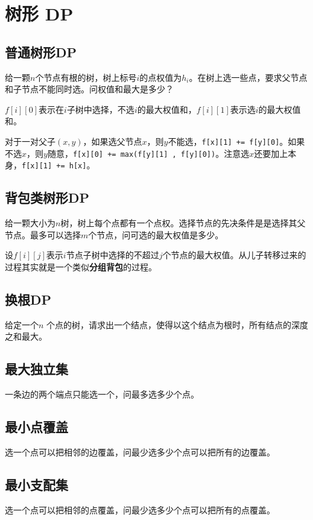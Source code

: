 \section{树形 DP}

\subsection{普通树形DP}

\begin{framed}
    给一颗$n$个节点有根的树，树上标号$i$的点权值为$h_i$。在树上选一些点，要求父节点和子节点不能同时选。问权值和最大是多少？
\end{framed}

$f[i][0]$表示在$i$子树中选择，不选$i$的最大权值和，$f[i][1]$表示选$i$的最大权值和。

对于一对父子$(x,y)$，如果选父节点$x$，则$y$不能选，\verb|f[x][1] += f[y][0]|。如果不选$x$，则$y$随意，\verb|f[x][0] += max(f[y][1] , f[y][0])|。注意选$x$还要加上本身，\verb|f[x][1] += h[x]|。



\subsection{背包类树形DP}

\begin{framed}
    给一颗大小为$n$树，树上每个点都有一个点权。选择节点的先决条件是是选择其父节点。最多可以选择$m$个节点，问可选的最大权值是多少。
\end{framed}

设$f[i][j]$表示$i$节点子树中选择的不超过$j$个节点的最大权值。从儿子转移过来的过程其实就是一个类似\textbf{分组背包}的过程。



\subsection{换根DP}

\begin{framed}
    给定一个$n$ 个点的树，请求出一个结点，使得以这个结点为根时，所有结点的深度之和最大。
\end{framed}



\subsection{最大独立集}
一条边的两个端点只能选一个，问最多选多少个点。


\subsection{最小点覆盖}
选一个点可以把相邻的边覆盖，问最少选多少个点可以把所有的边覆盖。


\subsection{最小支配集}
选一个点可以把相邻的点覆盖，问最少选多少个点可以把所有的点覆盖。

